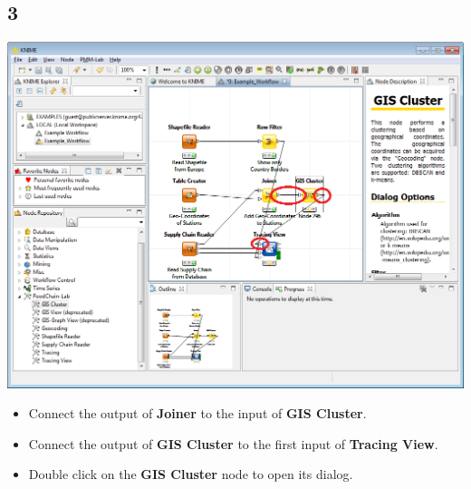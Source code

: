 \documentclass{beamer}
\begin{document}
\subsection{3}
\begin{frame}
	\begin{center}
  		\includegraphics[height=0.6\textheight]{3.png}
	\end{center}
	\begin{itemize}
		\item Connect the output of \textbf{Joiner} to the input of \textbf{GIS Cluster}.
		\item Connect the output of \textbf{GIS Cluster} to the first input of \textbf{Tracing View}.
		\item Double click on the \textbf{GIS Cluster} node to open its dialog.
	\end{itemize}
\end{frame}
\end{document}
